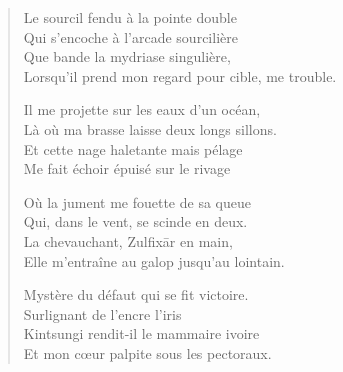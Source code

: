\begin{verse}%
  \quatrain%
  Le sourcil fendu à la pointe double\\
  Qui s’encoche à l’arcade sourcilière\\
  Que bande la mydriase singulière,\\
  Lorsqu’il prend mon regard pour cible, me trouble.

  Il me projette sur les eaux d’un océan,\\
  Là où ma brasse laisse deux longs sillons.\\
  Et cette nage haletante mais pélage%
  \\
  Me fait échoir épuisé sur le rivage

  Où la jument me fouette de sa queue\\
  Qui, dans le vent, se scinde en deux.\\
  La chevauchant, Zulfixār en main,\\
  Elle m’entraîne au galop jusqu’au lointain.

  Mystère du défaut qui se fit victoire.\\
  Surlignant de l’encre l’iris \label{foot.barroco}\\
  Kintsungi rendit-il le mammaire ivoire\\
  Et mon cœur palpite sous les pectoraux.
\end{verse}




